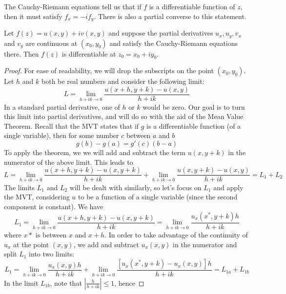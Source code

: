 \documentclass[handout]{ximera}
\begin{document}
The Cauchy-Riemann equations tell us that if $f$ is a differentiable function of $z$, 
then it must satisfy $f_x = -if_y$.
There is also a partial converse to this statement.  

\begin{theorem}
Let $f(z) = u(x,y) + iv(x,y)$ and suppose the partial derivatives $u_x, u_y, v_x$ and $v_y$ are 
continuous at $(x_0,y_0)$ and 
 satisfy the Cauchy-Riemann equations there. Then $f(z)$
is differentiable at $z_0 = x_0 + iy_0$.
\end{theorem}

\begin{proof}
For ease of readability, we will drop the subscripts on the point $(x_0,y_0)$.\\
Let $h$ and $k$ both be real numbers and consider the following limit:
\[
L = \lim_{h+ik \to 0} \frac{u(x+h, y+k) - u(x,y)}{h+ik} 
\]
In a standard partial derivative, one of $h$ or $k$ would be zero. 
Our goal is to turn this limit into partial derivatives,
and will do so with the aid of the Mean Value Theorem. Recall that the MVT states that 
if $g$ is a differentiable function (of a single variable), then for some number $c$ between $a$ and $b$
\[
g(b) -g(a) = g'(c)(b-a)
\]
To apply the theorem, we   
we will add and subtract the term $u(x,y+k)$ in the numerator of the above limit.
This leads to 
\[
L = \lim_{h+ik \to 0} \frac{u(x+h, y+k) - u(x,y+k)}{h+ik} + 
\lim_{h+ik \to 0} \frac{u(x, y+k) - u(x,y)}{h+ik} =  L_1 + L_2 
\]
The limits $L_1$ and $L_2$ will be dealt with similarly, so let's focus on $L_1$ and apply the MVT, 
considering $u$ to be a function of a single variable (since the second component is constant). We have
\[
L_1 = \lim_{h+ik \to 0} \frac{u(x+h, y+k) - u(x,y+k)}{h+ik} = \lim_{h+ik \to 0} \frac{u_x(x^*,y+k)h}{h+ik}
\]
where $x*$ is between $x$ and $x+h$. In order to take advantage of the continuity of $u_x$  at 
the point $(x,y)$, 
we add and subtract $u_x(x,y)$ in the numerator and split $L_1$ into two limits:
\[
L_1 = \lim_{h+ik \to 0} \frac{u_x(x,y)h}{h+ik} + 
\lim_{h+ik \to 0} \frac{[u_x(x^*,y+k)-u_x(x,y)]h}{h+ik}= L_{1a} + L_{1b}
\]
In the limit $L_{1b}$, note that $\left|\frac{h}{h+ik}\right| \leq 1$, hence
 

\end{proof}
\end{document}
